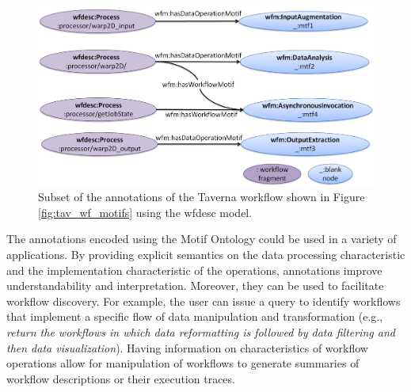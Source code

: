 \begin{figure}[ht!]
\centering
\includegraphics[scale=0.3]{Figures/tav-wf-annotated.png}
\caption{Subset of the annotations of the Taverna workflow shown in Figure \ref{fig:tav_wf_motifs} using the wfdesc model.}
\label{fig:annot-example}
\end{figure} 

The annotations encoded using the Motif Ontology could be used in a variety of applications. By providing explicit semantics on the data processing characteristic and the implementation characteristic of the operations, annotations improve understandability and interpretation. Moreover, they can be used to facilitate workflow discovery. For example, the user can issue a query to identify workflows that implement a specific flow of data manipulation and transformation (e.g., {\em return the workflows in which data reformatting is followed by data filtering and then data visualization}). Having information on characteristics of workflow operations allow for manipulation of workflows to generate summaries \cite{summaryBigData13} of workflow descriptions or their execution traces.
 
